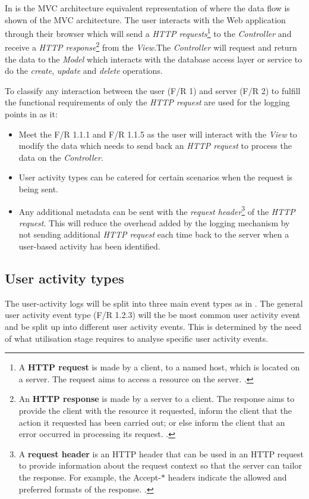In  is the MVC architecture equivalent representation of  where the data flow is shown of the MVC architecture. The user interacts with the Web application through their browser which will send a \textit{HTTP requests}\footnote{A \textbf{HTTP request} is made by a client, to a named host, which is located on a server. The request aims to access a resource on the server. \cite{IBM2021}.} to the \textit{Controller} and receive a \textit{HTTP response}\footnote{An \textbf{HTTP response} is made by a server to a client. The response aims to provide the client with the resource it requested, inform the client that the action it requested has been carried out; or else inform the client that an error occurred in processing its request. \cite{IBM2021a}.} from the \textit{View}.The \textit{Controller} will request and return the data to the \textit{Model} which interacts with the database access layer or service to do the \textit{create}, \textit{update} and \textit{delete} operations.\par To classify any interaction between the user (F/R 1) and server (F/R 2) to fulfill the functional requirements of  only the \textit{HTTP request} are used for the logging points in  as it:

\begin{itemize}
	\item Meet the F/R 1.1.1 and F/R 1.1.5 as the user will interact with the \textit{View} to modify the data which needs to send back an \textit{HTTP request} to process the data on the \textit{Controller}.
	\item User activity types can be catered for certain scenarios when the request is being sent.
	\item Any additional metadata can be sent with the \textit{request header}\footnote{A \textbf{request header} is an HTTP header that can be used in an HTTP request to provide information about the request context so that the server can tailor the response. For example, the Accept-$\ast$ headers indicate the allowed and preferred formats of the response. \cite{Mozilla2022}.} of the \textit{HTTP request}. This will reduce the overhead added by the logging mechanism by not sending additional \textit{HTTP request} each time back to the server when a user-based activity has been identified.
\end{itemize}

\subsection{User activity types}\label{sec:ch2:userActivityTypes}
The user-activity logs will be split into three main event types as in . The general user activity event type (F/R 1.2.3) will the be most common user activity event and be split up into different user activity events. This is determined by the need of what utilisation stage requires to analyse specific user activity events. 

